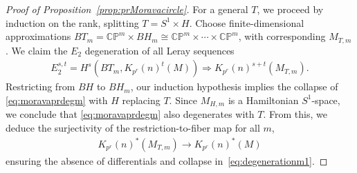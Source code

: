 \documentclass[11pt, reqno]{amsart}
\theoremstyle{plain}
\theoremstyle{definition}
\begin{document}
\begin{proof}[Proof of Proposition~\ref{prop:prMoravacircle}]
For a general $T$, we proceed by induction on the rank, splitting  $T=S^1 \times H$. 
Choose  finite-dimensional approximations 
$BT_m =  \mathbb{CP}^m\times BH_m\cong \mathbb{CP}^m \times \cdots \times \mathbb{CP}^m$, 
with corresponding $M_{T,m}$. We claim  the $E_2$ degeneration of all Leray sequences  
\begin{align} \label{eq:moravaprdegm} 
E_2^{s,t}= H^s(BT_m, K_{p^r}(n)^t(M)) \Rightarrow K_{p^r}(n)^{s+t}(M_{T,m}).
\end{align} 
Restricting from $BH$ to $BH_m$, our induction hypothesis implies the collapse of \eqref{eq:moravaprdegm} with $H$ replacing $T$.  Since $M_{H,m}$ is a Hamiltonian $S^1$-space, 
we conclude that \eqref{eq:moravaprdegm} also degenerates with $T$.  
From this,  we deduce the surjectivity of the restriction-to-fiber map for all 
$m$, 
\begin{align} \label{eq:degenerationmorava} 
K_{p^r}(n)^*(M_{T,m}) \to K_{p^r}(n)^*(M)
\end{align} 
ensuring the absence of differentials and collapse in~\eqref{eq:degenerationm1}. 
\end{proof} 
\end{document}
